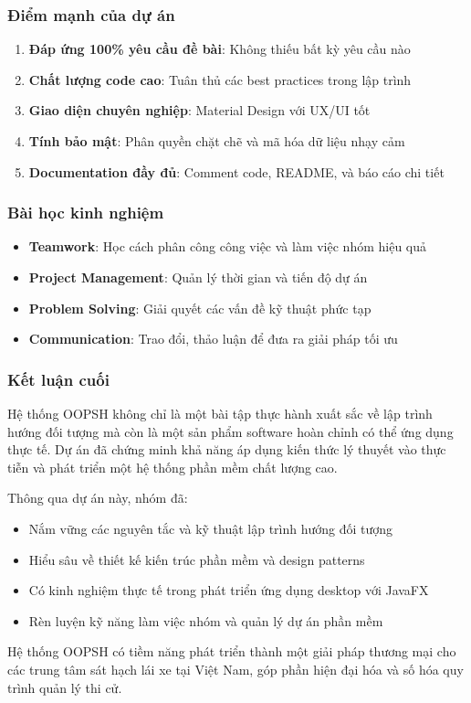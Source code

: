 \documentclass[12pt,a4paper]{article}
\begin{document}
\subsubsection{Điểm mạnh của dự án}
\begin{enumerate}
    \item \textbf{Đáp ứng 100\% yêu cầu đề bài}: Không thiếu bất kỳ yêu cầu nào
    \item \textbf{Chất lượng code cao}: Tuân thủ các best practices trong lập trình
    \item \textbf{Giao diện chuyên nghiệp}: Material Design với UX/UI tốt
    \item \textbf{Tính bảo mật}: Phân quyền chặt chẽ và mã hóa dữ liệu nhạy cảm
    \item \textbf{Documentation đầy đủ}: Comment code, README, và báo cáo chi tiết
\end{enumerate}

\subsubsection{Bài học kinh nghiệm}
\begin{itemize}
    \item \textbf{Teamwork}: Học cách phân công công việc và làm việc nhóm hiệu quả
    \item \textbf{Project Management}: Quản lý thời gian và tiến độ dự án
    \item \textbf{Problem Solving}: Giải quyết các vấn đề kỹ thuật phức tạp
    \item \textbf{Communication}: Trao đổi, thảo luận để đưa ra giải pháp tối ưu
\end{itemize}

\subsubsection{Kết luận cuối}
Hệ thống OOPSH không chỉ là một bài tập thực hành xuất sắc về lập trình hướng đối tượng mà còn là một sản phẩm software hoàn chỉnh có thể ứng dụng thực tế. Dự án đã chứng minh khả năng áp dụng kiến thức lý thuyết vào thực tiễn và phát triển một hệ thống phần mềm chất lượng cao.

Thông qua dự án này, nhóm đã:
\begin{itemize}
    \item Nắm vững các nguyên tắc và kỹ thuật lập trình hướng đối tượng
    \item Hiểu sâu về thiết kế kiến trúc phần mềm và design patterns
    \item Có kinh nghiệm thực tế trong phát triển ứng dụng desktop với JavaFX
    \item Rèn luyện kỹ năng làm việc nhóm và quản lý dự án phần mềm
\end{itemize}

Hệ thống OOPSH có tiềm năng phát triển thành một giải pháp thương mại cho các trung tâm sát hạch lái xe tại Việt Nam, góp phần hiện đại hóa và số hóa quy trình quản lý thi cử.
\end{document}
